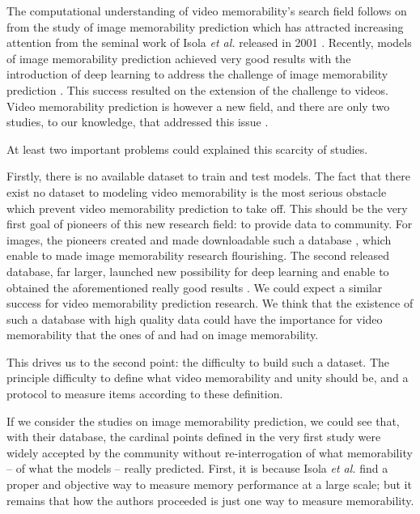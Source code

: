 \documentclass[sigconf]{acmart}
\begin{document}
The computational understanding of video memorability's search field follows on from the study of image memorability prediction which has attracted increasing attention from the seminal work of Isola \textit{et al.} released in 2001 \cite{isola_2011_makes}.
Recently, models of image memorability prediction achieved very good results with the introduction of deep learning to address the challenge of image memorability prediction \cite{khosla_2015_understanding,baveye_2016_deep,squalli_2017_deep}.
This success resulted on the extension of the challenge to videos.
Video memorability prediction is however a new field, and there are only two studies, to our knowledge, that addressed this issue \cite{han_2015_learning,shekhar_2017_show}.

At least two important problems could explained this scarcity of studies.

Firstly, there is no available dataset to train and test models.
The fact that there exist no dataset to modeling video memorability is the most serious obstacle which prevent video memorability prediction to take off.
This should be the very first goal of pioneers of this new research field: to provide data to community.
For images, the pioneers created and made downloadable such a database \cite{isola_2011_makes}, which enable to made image memorability research flourishing.
The second released database, far larger, launched new possibility for deep learning and enable to obtained the aforementioned really good results \cite{khosla_2015_understanding}.
We could expect a similar success for video memorability prediction research.
We think that the existence of such a database with high quality data could have the importance for video memorability that the ones of \cite{isola_2011_makes} and \cite{khosla_2015_understanding} had on image memorability.%

This drives us to the second point: the difficulty to build such a dataset.
The principle difficulty to define what video memorability and unity should be, and a protocol to measure items according to these definition.

If we consider the studies on image memorability prediction, we could see that, with their database, the cardinal points defined in the very first study \cite{isola_2011_makes} were widely accepted by the community without re-interrogation of what memorability -- of what the models -- really predicted.
First, it is because Isola \textit{et al.} find a proper and objective way to measure memory performance at a large scale; but it remains that how the authors proceeded is just one way to measure memorability.
\end{document}
